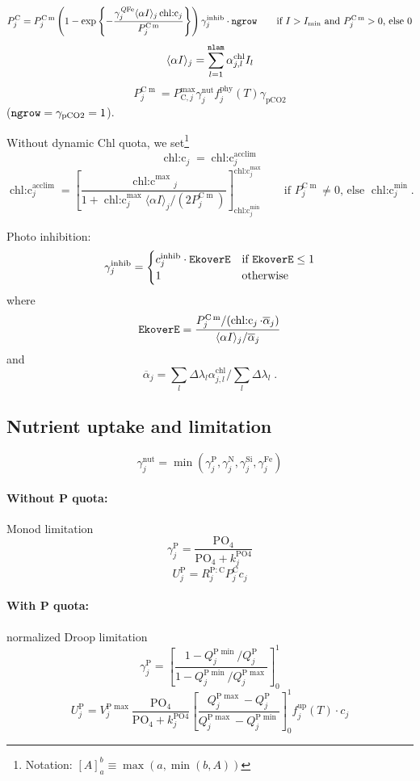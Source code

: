 \documentclass[11pt,letterpaper,english]{article}
\def\|#1|{\operatorname{#1}}
\DeclareMathOperator{\Fe}{Fe}
\DeclareMathOperator{\Si}{Si}
\DeclareMathOperator{\chl}{chl}
\DeclareMathOperator{\chlc}{chl\text{:}c}
\DeclareMathOperator{\POiv}{PO4}
\DeclareMathOperator{\QFe}{\mathit{Q}Fe}
\newcommand{\N}{\mathrm{N}}
\newcommand{\C}{\mathrm{C}}
\renewcommand{\P}{\mathrm{P}}
\newcommand{\m}{\operatorname{m}}
\newcommand{\phy}{{\text{phy}}}
\newcommand{\up}{{\text{up}}}
\newcommand{\inhib}{{\text{inhib}}}
\newcommand{\X}{c}
\begin{document}
\[
  P^\C_j = P^{\C\m}_j \left(
    1 - \exp\left\{ -\frac{\gamma^{\QFe}_j
                     \langle\alpha I\rangle_j
                     \chlc_j }{ P^{\C\m}_j }
            \right\}
  \right) \gamma^\inhib_j
  \cdot{\tt ngrow}
  \qquad\text{if } I>I_{\min} \text{ and } P^{\C\m}_j > 0 \text{, else } 0
\]
\[
  \langle\alpha I\rangle_j = \sum_{l=1}^{\tt nlam} \alpha^{\chl}_{j,l} I_l
\]
\[
  P^{\C\m}_j = P_{\C,j}^{\max} \gamma^{\|nut|}_j f^\phy_j(T) \gamma_{\|pCO2|}
\]
(${\tt ngrow}=\gamma_{\|pCO2|}=1$).

Without dynamic Chl quota, we set\footnote{Notation:
$[A]_a^b\equiv\max(a,\min(b,A))$}
\[
  \chlc_j = \chlc_j^{\|acclim|}
\]
\[
  \chlc_j^{\|acclim|} = \left[
      \frac{\chlc^{\max}{_j}}
           {1 + \chlc^{\max}_j\langle\alpha I\rangle_j/(2P^{\C\m}_j)}
    \right]_{\chlc^{\min}_j}^{\chlc^{\max}_j}
  \qquad \text{if } P^{\C\m}_j \ne 0 \text{, else } \chlc^{\min}_j .
\]

Photo inhibition:
\[
  \gamma^\inhib_j = \begin{cases}
    c^\inhib_j \cdot \verb|EkoverE| & \text{if } \verb|EkoverE| \le 1 \\
    1                               & \text{otherwise}
  \end{cases}
\]
where
\[
  \verb|EkoverE| = \frac{P^{\C\m}_j/(\chlc_j\cdot\overline{\alpha}_j)}
                   {\langle\alpha I\rangle_j/\overline{\alpha}_j}
\]
and
\[
  \overline{\alpha}_j = \sum_l \Delta\lambda_l \alpha^{\chl}_{j,l} \Big/
                        \sum_l \Delta\lambda_l
  \;.
\]



\subsection{Nutrient uptake and limitation}

\[
  \gamma^{\|nut|}_j = \min(\gamma^\P_j, \gamma^\N_j, \gamma^{\Si}_j,
                           \gamma^{\Fe}_j)
\]

\paragraph{Without P quota:} Monod limitation
\[
  \gamma^\P_j = \frac{\mathrm{PO}_4}{\mathrm{PO}_4 + k^{\POiv}_j}
\]
\[
  U^\P_j = R^{\P:\C}_j P^\C_j \X_j
\]
\paragraph{With P quota:} normalized Droop limitation
\[
  \gamma^\P_j = \left[ \frac{1 - Q^{\P\min}_j/Q^{\P}_j}
                            {1 - Q^{\P\min}_j/Q^{\P\max}_j}
                \right]_0^1
\]
\[
  U^\P_j = V^{\P\max}_j \frac{\mathrm{PO}_4}{\mathrm{PO}_4 + k^{\POiv}_j}
                \left[ \frac{Q^{\P\max}_j - Q^{\P}_j}
                            {Q^{\P\max}_j - Q^{\P\min}_j}
                \right]_0^1
           f^\up_j(T) \cdot \X_j
\]
\end{document}
